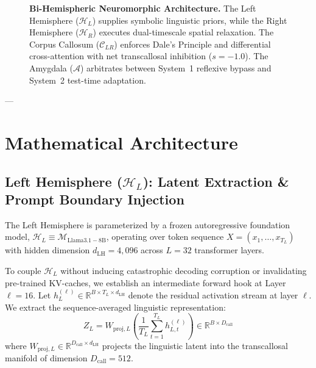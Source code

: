 \documentclass[11pt,a4paper]{article}
\theoremstyle{plain}
\theoremstyle{definition}
\theoremstyle{remark}
\newcommand{\HL}{\mathcal{H}_L}
\newcommand{\HR}{\mathcal{H}_R}
\newcommand{\CC}{\mathcal{C}_{LR}}
\newcommand{\AM}{\mathcal{A}}
\begin{document}
\begin{figure}[t]
\caption{\textbf{Bi-Hemispheric Neuromorphic Architecture.} The Left Hemisphere ($\HL$) supplies symbolic linguistic priors, while the Right Hemisphere ($\HR$) executes dual-timescale spatial relaxation. The Corpus Callosum ($\CC$) enforces Dale's Principle and differential cross-attention with net transcallosal inhibition ($s = -1.0$). The Amygdala ($\AM$) arbitrates between System~1 reflexive bypass and System~2 test-time adaptation.}
\label{fig:architecture}
\end{figure}

---

\section{Mathematical Architecture}
\label{sec:architecture}

\subsection{Left Hemisphere ($\HL$): Latent Extraction \& Prompt Boundary Injection}

The Left Hemisphere is parameterized by a frozen autoregressive foundation model, $\HL \equiv \mathcal{M}_{\mathrm{Llama3.1-8B}}$, operating over token sequence $X = (x_1, \dots, x_{T_L})$ with hidden dimension $d_{\mathrm{LH}} = 4{,}096$ across $L = 32$ transformer layers. 

To couple $\HL$ without inducing catastrophic decoding corruption or invalidating pre-trained KV-caches, we establish an intermediate forward hook at Layer $\ell = 16$. Let $h_L^{(\ell)} \in \mathbb{R}^{B \times T_L \times d_{\mathrm{LH}}}$ denote the residual activation stream at layer $\ell$. We extract the sequence-averaged linguistic representation:
\begin{equation}
    Z_L = W_{\mathrm{proj}, L} \left( \frac{1}{T_L} \sum_{t=1}^{T_L} h_{L, t}^{(\ell)} \right) \in \mathbb{R}^{B \times D_{\mathrm{call}}}
\end{equation}
where $W_{\mathrm{proj}, L} \in \mathbb{R}^{D_{\mathrm{call}} \times d_{\mathrm{LH}}}$ projects the linguistic latent into the transcallosal manifold of dimension $D_{\mathrm{call}} = 512$.
\end{document}
